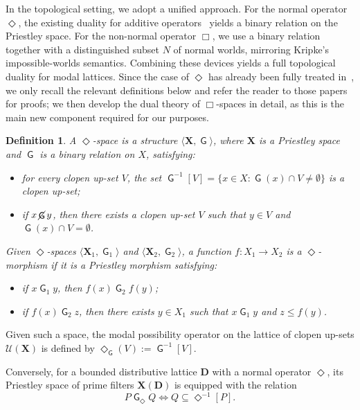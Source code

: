 \documentclass{article}
\newtheorem{definition}[theorem]{Definition}
\DeclareMathOperator{\G}{\mathsf{G}}
\DeclareMathOperator{\notG}{\cancel{ \G}}
\newcommand{\D}{\mathbf{D}}
\newcommand{\X}{\mathbf{X}}
\newcommand{\U}{\mathcal{U}}
\begin{document}
In the topological setting, we adopt a unified approach. For the normal operator $\Diamond$, the existing duality for additive operators~\cite{cignoli1991remarks, petrovich1996} yields a binary relation on the Priestley space. For the non-normal operator $\Box$, we use a binary relation together with a distinguished subset $N$ of normal worlds, mirroring Kripke's impossible-worlds semantics. Combining these devices yields a full topological duality for modal lattices. Since the case of $\Diamond$ has already been fully treated in~\cite{cignoli1991remarks, petrovich1996}, we only recall the relevant definitions below and refer the reader to those papers for proofs; we then develop the dual theory of $\Box$-spaces in detail, as this is the main new component required for our purposes.

\begin{definition}
\label{def:diamond-space}
A \emph{$\Diamond$-space} is a structure $\langle \X, \G \rangle$, where $\X$ is a Priestley space and $\G$ is a binary relation on $X$, satisfying:
\begin{itemize}
    \item for every clopen up-set $V$, the set $\G^{-1}[V]=\{x\in X:\G(x)\cap V\neq\emptyset\}$ is a clopen up-set;
    \item if $x\notG y$, then there exists a clopen up-set $V$ such that $y\in V$ and $\G(x)\cap V=\emptyset$.
\end{itemize}

Given $\Diamond$-spaces $\langle \X_1, \G_1 \rangle$ and $\langle \X_2, \G_2 \rangle$, a function
$f \colon X_1 \to X_2$ is a \emph{$\Diamond$-morphism} if it is a Priestley morphism satisfying:
\begin{itemize}
    \item if $x \G_1 y$, then $f(x) \G_2 f(y)$;
    \item if $f(x) \G_2 z$, then there exists $y \in X_1$ such that $x \G_1 y$ and $z \leq f(y)$.
\end{itemize}
\end{definition}

Given such a space, the modal possibility operator on the lattice of clopen up-sets $\U(\X)$ is defined by $\Diamond_{\G}(V) := \G^{-1}[V]$.

Conversely, for a bounded distributive lattice $\D$ with a normal operator $\Diamond$, its Priestley space of prime filters $\X(\D)$ is equipped with the relation
\[
    P\G_{\Diamond} Q \iff Q \subseteq \Diamond^{-1}[P].
\]
\end{document}
